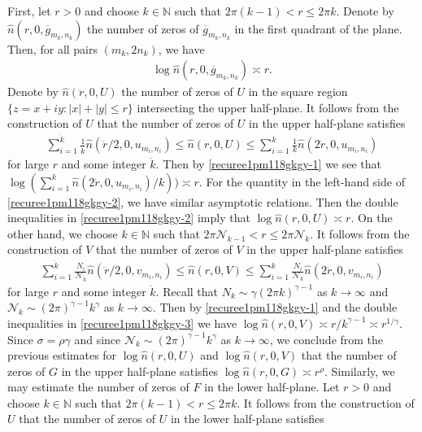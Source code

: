 \documentclass[12pt]{amsart}
\numberwithin{equation}{section}
\begin{document}
First, let $r>0$ and choose $k\in \mathbb{N}$ such that $2\pi(k-1)<r\leq 2\pi k$. Denote by $\hat{n}(r,0,\overline{g}_{m_k,n_k})$ the number of zeros of $\overline{g}_{m_k,n_k}$ in the first quadrant of the plane. Then, for all pairs $(m_k,2n_k)$, we have
\begin{equation}\label{recuree1pm118gkgy-1}
\begin{split}
\log\hat{n}(r,0,\overline{g}_{m_k,n_k})\asymp r.
\end{split}
\end{equation}
Denote by $\hat{n}(\ddot{r},0,U)$ the number of zeros of $U$ in the square region $\{z=x+iy:|x|+|y|\leq r\}$ intersecting the upper half-plane. It follows from the construction of $U$ that the number of zeros of $U$ in the upper half-plane satisfies
\begin{equation}\label{recuree1pm118gkgy-2}
\begin{split}
\sum_{i=1}^{\ddot{k}}\frac{1}{\ddot{k}}\hat{n}(\ddot{r}/2,0,u_{m_i,n_i})\leq \hat{n}(r,0,U)\leq \sum_{i=1}^{k}\frac{1}{k}\hat{n}(2\ddot{r},0,u_{m_i,n_i})
\end{split}
\end{equation}
for large $r$ and some integer $\ddot{k}$. Then by \eqref{recuree1pm118gkgy-1} we see that $\log(\sum_{i=1}^{k}\hat{n}(2\ddot{r},0,u_{m_i,n_i})/k))\asymp r$. For the quantity in the left-hand side of \eqref{recuree1pm118gkgy-2}, we have similar asymptotic relations. Then the double inequalities in \eqref{recuree1pm118gkgy-2} imply that $\log\hat{n}(r,0,U)\asymp r$. On the other hand, we choose $k\in \mathbb{N}$ such that $2\pi\mathcal{N}_{k-1} <r \leq 2\pi \mathcal{N}_k$. It follows from the construction of $V$ that the number of zeros of $V$ in the upper half-plane satisfies
\begin{equation}\label{recuree1pm118gkgy-3}
\begin{split}
\sum_{i=1}^{\ddot{k}}\frac{N_i}{\mathcal{N}_{\ddot{k}}}\hat{n}(\ddot{r}/2,0,v_{m_i,n_i})\leq \hat{n}(r,0,V)\leq \sum_{i=1}^{k}\frac{N_i}{\mathcal{N}_k}\hat{n}(2\ddot{r},0,v_{m_i,n_i})
\end{split}
\end{equation}
for large $r$ and some integer $\ddot{k}$. Recall that $N_k\sim \gamma(2\pi k)^{\gamma-1}$ as $k\to\infty$ and $\mathcal{N}_k\sim (2\pi)^{\gamma-1}k^{\gamma}$ as $k\to\infty$. Then by \eqref{recuree1pm118gkgy-1} and the double inequalities in \eqref{recuree1pm118gkgy-3} we have $\log\hat{n}(r,0,V)\asymp r/k^{\gamma-1}\asymp r^{1/\gamma}$. Since $\sigma=\rho\gamma$ and since $\mathcal{N}_k\sim (2\pi)^{\gamma-1}k^{\gamma}$ as $k\to\infty$, we conclude from the previous estimates for $\log\hat{n}(r,0,U)$ and $\log\hat{n}(r,0,V)$ that the number of zeros of $G$ in the upper half-plane satisfies $\log \hat{n}(r,0,G)\asymp r^{\rho}$. Similarly, we may estimate the number of zeros of $F$ in the lower half-plane. Let $r>0$ and choose $k\in \mathbb{N}$ such that $2\pi(k-1)<r\leq 2\pi k$. It follows from the construction of $U$ that the number of zeros of $U$ in the lower half-plane satisfies
\end{document}
